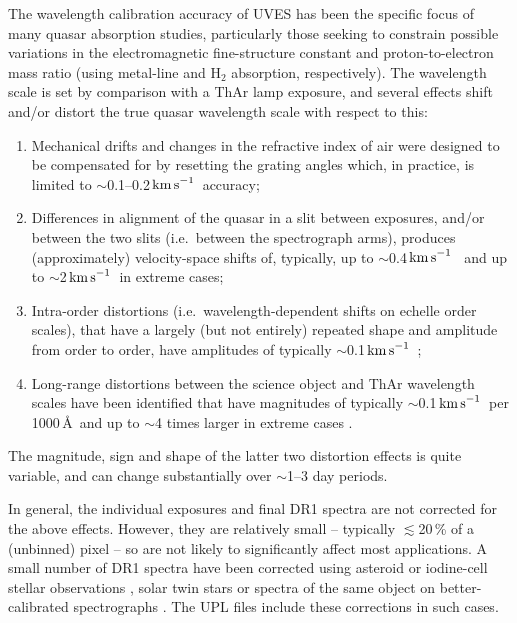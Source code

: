 \documentclass[fleqn,usenatbib,usedcolumn]{mnras}
\renewcommand{\la}{\lesssim} %
\newcommand{\kms}{\ensuremath{\textrm{km\,s}^{-1}}}
\begin{document}
The wavelength calibration accuracy of UVES has been the specific focus of many quasar absorption studies, particularly those seeking to constrain possible variations in the electromagnetic fine-structure constant and proton-to-electron mass ratio (using metal-line and H$_2$ absorption, respectively). The wavelength scale is set by comparison with a ThAr lamp exposure, and several effects shift and/or distort the true quasar wavelength scale with respect to this:
\begin{enumerate}
\item Mechanical drifts and changes in the refractive index of air were designed to be compensated for by resetting the grating angles \citep{Dekker:2000:534} which, in practice, is limited to $\sim$0.1--0.2\,\kms\ accuracy;
\item Differences in alignment of the quasar in a slit between exposures, and/or between the two slits (i.e.\ between the spectrograph arms), produces (approximately) velocity-space shifts of, typically, up to $\sim$0.4\,\kms\ \citep[e.g.][]{Molaro:2013:A68,Rahmani:2013:861,Evans:2014:128,Kotus:2017:3679} and up to $\sim$2\,\kms\ in extreme cases;
\item Intra-order distortions (i.e.\ wavelength-dependent shifts on echelle order scales), that have a largely (but not entirely) repeated shape and amplitude from order to order, have amplitudes of typically $\sim$0.1\,\kms\ \citep[up to 0.4\,\kms\ in extreme cases; e.g.][]{Whitmore:2010:89,Whitmore:2015:446};
\item Long-range distortions between the science object and ThAr wavelength scales have been identified that have magnitudes of typically $\sim$0.1\,\kms\ per 1000\,\AA\ and up to $\sim$4 times larger in extreme cases \citep[e.g.][]{Rahmani:2013:861,Bagdonaite:2014:10,Whitmore:2015:446}.
\end{enumerate}
The magnitude, sign and shape of the latter two distortion effects is quite variable, and can change substantially over $\sim$1--3 day periods.

In general, the individual exposures and final DR1 spectra are not corrected for the above effects. However, they are relatively small -- typically $\la$20\,\% of a (unbinned) pixel -- so are not likely to significantly affect most applications. A small number of DR1 spectra have been corrected using asteroid or iodine-cell stellar observations \citep[e.g.][]{Evans:2014:128}, solar twin stars \citep[e.g.][]{Dapra:2015:489,Dapra:2016:192} or spectra of the same object on better-calibrated spectrographs \citep[e.g.][]{Kotus:2017:3679}. The UPL files include these corrections in such cases.
\end{document}
